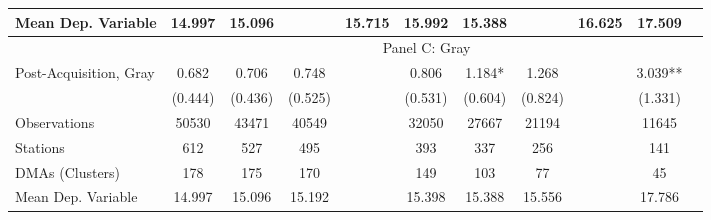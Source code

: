{\begin{tabular}{l*{10}{c}}
Mean Dep. Variable&   14.997   &   15.096   &         &   15.715   &   15.992   &   15.388   &         &   16.625   &   17.509   \\
\midrule \ & \multicolumn{9}{c}{Panel C: Gray} \\\cmidrule(lr){2-10}
Post-Acquisition, Gray&    0.682   &    0.706   &    0.748   &         &    0.806   &    1.184*  &    1.268   &         &    3.039** \\
                &  (0.444)   &  (0.436)   &  (0.525)   &         &  (0.531)   &  (0.604)   &  (0.824)   &         &  (1.331)   \\
\midrule
Observations    &    50530   &    43471   &    40549   &         &    32050   &    27667   &    21194   &         &    11645   \\
Stations        &      612   &      527   &      495   &         &      393   &      337   &      256   &         &      141   \\
DMAs (Clusters) &      178   &      175   &      170   &         &      149   &      103   &       77   &         &       45   \\
Mean Dep. Variable&   14.997   &   15.096   &   15.192   &         &   15.398   &   15.388   &   15.556   &         &   17.786   \\
\bottomrule \end{tabular}}
